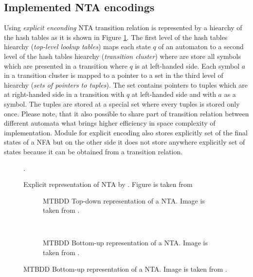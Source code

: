 \subsection{Implemented NTA encodings}

Using \emph{explicit enconding} NTA transition relation is represented by a hiearchy of the hash tables as it is shown in Figure \ref{fig:explnta}.
The first level of the hash tables hiearchy (\emph{top-level lookup tables}) maps each state $q$ of an automaton to 
a second level of the hash tables hiearchy (\emph{transition cluster}) where are store all symbols which
are presented in a transition where $q$ is at left-handed side.
Each symbol $a$ in a transition cluster is mapped to a pointer to a set in the third level of hiearchy (\emph{sets of pointers to tuples}).
The set contains pointers to tuples which are at right-handed side in a transition with $q$ at left-handed side and with $a$ as a symbol.
The tuples are stored at a special set where every tuples is stored only once.
Please note, that it also possible to share part of transition relation between different automata what
brings higher efficiency in space complexity of implementation.
Module for explicit encoding also stores explicitly set of the final states of a NFA but on
the other side it does not store anywhere explicitly set of states because it can be obtained from a transition relation.

\begin{figure}[bt]
\begin{center}

	\caption{Explicit representation of NTA by \vata. Figure is taken from \cite{tacas12}}.
	\label{fig:explnta}
\end{center}
\end{figure}

\begingroup
{}%
\begin{figure}[bt]
\label{fig:symnta}
	\centering
	\begin{subfigure}{.5\textwidth}
		\centering
		
		\caption{MTBDD Top-down representation of a NTA. Image is taken from \cite{tacas12}.}
		\label{fig:mtbdd_td}
	\end{subfigure}%
	~
	\begin{subfigure}{.5\textwidth}
	\centering
	
	\caption{MTBDD Bottom-up representation of a NTA. Image is taken from \cite{tacas12}.}
	\label{fig:mtbdd_bu}
	\end{subfigure}%
\end{figure}
\endgroup

